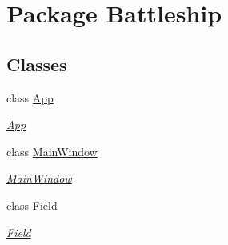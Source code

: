 \hypertarget{namespace_battleship}{\section{Package Battleship}
\label{namespace_battleship}
}
\subsection*{Classes}
\begin{DoxyCompactItemize}
\item 
class \hyperlink{class_battleship_1_1_app}{App}
\begin{DoxyCompactList}\small\item\em \hyperlink{class_battleship_1_1_app}{App} \end{DoxyCompactList}\item 
class \hyperlink{class_battleship_1_1_main_window}{Main\-Window}
\begin{DoxyCompactList}\small\item\em \hyperlink{class_battleship_1_1_main_window}{Main\-Window} \end{DoxyCompactList}\item 
class \hyperlink{class_battleship_1_1_field}{Field}
\begin{DoxyCompactList}\small\item\em \hyperlink{class_battleship_1_1_field}{Field} \end{DoxyCompactList}\end{DoxyCompactItemize}
